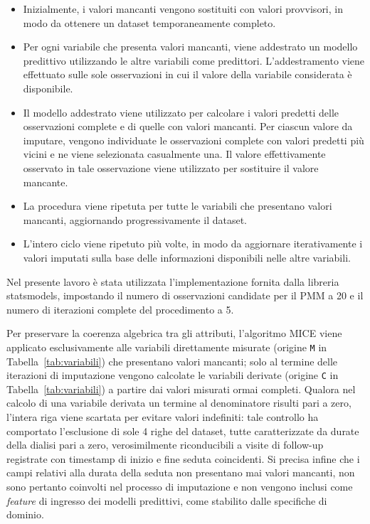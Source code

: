 \documentclass[a4paper,12pt]{report}
\begin{document}
\begin{itemize}
    \item Inizialmente, i valori mancanti vengono sostituiti con valori provvisori, in modo da ottenere un dataset temporaneamente completo.
    \item Per ogni variabile che presenta valori mancanti, viene addestrato un modello predittivo utilizzando le altre variabili come predittori. L'addestramento viene effettuato sulle sole osservazioni in cui il valore della variabile considerata è disponibile.
    \item Il modello addestrato viene utilizzato per calcolare i valori predetti delle osservazioni complete e di quelle con valori mancanti. Per ciascun valore da imputare, vengono individuate le osservazioni complete con valori predetti più vicini e ne viene selezionata casualmente una. Il valore effettivamente osservato in tale osservazione viene utilizzato per sostituire il valore mancante.
    \item La procedura viene ripetuta per tutte le variabili che presentano valori mancanti, aggiornando progressivamente il dataset.
    \item L'intero ciclo viene ripetuto più volte, in modo da aggiornare iterativamente i valori imputati sulla base delle informazioni disponibili nelle altre variabili.
\end{itemize}

Nel presente lavoro è stata utilizzata l'implementazione fornita dalla libreria statsmodels, impostando il numero di osservazioni candidate per il PMM a 20 e il numero di iterazioni complete del procedimento a 5.

Per preservare la coerenza algebrica tra gli attributi, l'algoritmo MICE viene applicato esclusivamente alle variabili direttamente misurate (origine \texttt{M} in Tabella~\ref{tab:variabili}) che presentano valori mancanti; solo al termine delle iterazioni di imputazione vengono calcolate le variabili derivate (origine \texttt{C} in Tabella~\ref{tab:variabili}) a partire dai valori misurati ormai completi. Qualora nel calcolo di una variabile derivata un termine al denominatore risulti pari a zero, l'intera riga viene scartata per evitare valori indefiniti: tale controllo ha comportato l'esclusione di sole 4 righe del dataset, tutte caratterizzate da durate della dialisi pari a zero, verosimilmente riconducibili a visite di follow-up registrate con timestamp di inizio e fine seduta coincidenti. Si precisa infine che i campi relativi alla durata della seduta non presentano mai valori mancanti, non sono pertanto coinvolti nel processo di imputazione e non vengono inclusi come \textit{feature} di ingresso dei modelli predittivi, come stabilito dalle specifiche di dominio.
\end{document}

